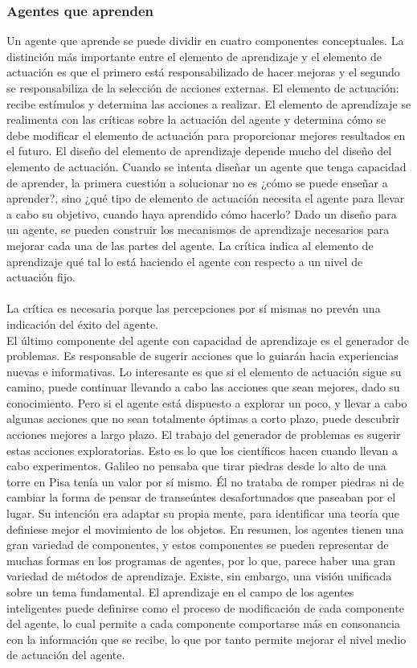 \documentclass[12pt,a4paper]{report}
\begin{document}
\subsubsection{Agentes que aprenden}
Un agente que aprende se puede dividir en cuatro componentes conceptuales. La distinción más importante entre el elemento de aprendizaje y el elemento de actuación es que el primero está responsabilizado de hacer mejoras y el segundo se responsabiliza de la selección de acciones externas. El elemento de actuación: recibe estímulos y determina las acciones a realizar. El elemento de aprendizaje se realimenta con las críticas sobre la actuación del agente y determina cómo se debe modificar el elemento de actuación para proporcionar mejores resultados en el futuro. El diseño del elemento de aprendizaje depende mucho del diseño del elemento de actuación. Cuando se intenta diseñar un agente que tenga capacidad de aprender, la primera cuestión a solucionar no es ¿cómo se puede enseñar a aprender?, sino ¿qué tipo de elemento de actuación necesita el agente para llevar a cabo su objetivo, cuando haya aprendido cómo hacerlo? Dado un diseño para un agente, se pueden construir los mecanismos de aprendizaje necesarios para mejorar cada una de las partes del agente. La crítica indica al elemento de aprendizaje qué tal lo está haciendo el agente con respecto a un nivel de actuación fijo.\\\\ La crítica es necesaria porque las percepciones por sí mismas no prevén una indicación del éxito del agente.\\El último componente del agente con capacidad de aprendizaje es el generador de problemas. Es responsable de sugerir acciones que lo guiarán hacia experiencias nuevas e informativas. Lo interesante es que si el elemento de actuación sigue su camino, puede continuar llevando a cabo las acciones que sean mejores, dado su conocimiento. Pero si el agente está dispuesto a explorar un poco, y llevar a cabo algunas acciones que no sean totalmente óptimas a corto plazo, puede descubrir acciones mejores a largo plazo. El trabajo del generador de problemas es sugerir estas acciones exploratorias. Esto es lo que los científicos hacen cuando llevan a cabo experimentos. Galileo no pensaba que tirar piedras desde lo alto de una torre en Pisa tenía un valor por sí mismo. Él no trataba de romper piedras ni de cambiar la forma de pensar de transeúntes desafortunados que paseaban por el lugar. Su intención era adaptar su propia mente, para identificar una teoría que definiese mejor el movimiento de los objetos. En resumen, los agentes tienen una gran variedad de componentes, y estos componentes se pueden representar de muchas formas en los programas de agentes, por lo que, parece haber una gran variedad de métodos de aprendizaje. Existe, sin embargo, una visión unificada sobre un tema fundamental. El aprendizaje en el campo de los agentes inteligentes puede definirse como el proceso de modificación de cada componente del agente, lo cual permite a cada componente comportarse más en consonancia con la información que se recibe, lo que por tanto permite mejorar el nivel medio de actuación del agente.
\end{document}
